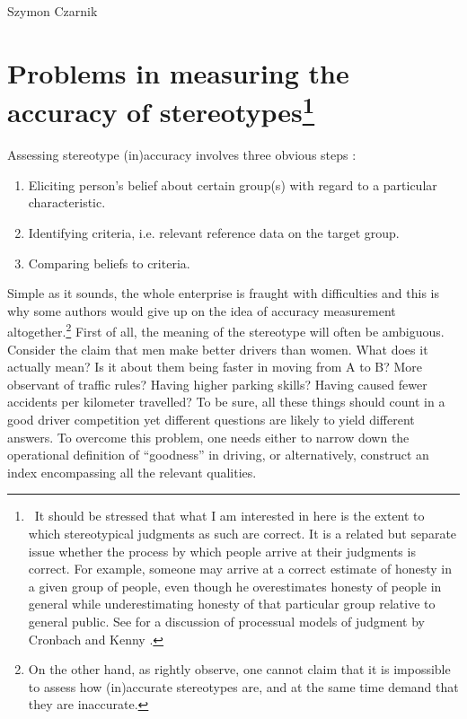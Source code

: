 \begin{artengenv}{Szymon Czarnik}
\enlargethispage{.5\baselineskip}
\section[Problems in measuring the accuracy of stereotypes]{Problems in measuring the accuracy of stereotypes\footnote{\ It should be stressed that what I am interested in here is the extent to which stereotypical judgments as such are correct. It is a related but separate issue whether the process by which people arrive at their judgments is correct. For example, someone may arrive at a correct estimate of honesty in a given group of people, even though he overestimates honesty of people in general while underestimating honesty of that particular group relative to general public. See
\parencite[][]{jussim_stereotype_2016} %
 for a discussion of processual models of judgment by Cronbach 
\parencite*[][]{cronbach_processes_1955} %
 and Kenny 
\parencite*[][]{kenny_interpersonal_1994}. %
 }}
Assessing stereotype (in)accuracy involves three obvious steps
\parencite[][]{jussim_stereotype_2015}:%


\begin{enumerate}
\item Eliciting person's belief about certain group(s) with regard to a particular characteristic.
\item Identifying criteria, i.e. relevant reference data on the target group.
\item Comparing beliefs to criteria.
\end{enumerate}
Simple as it sounds, the whole enterprise is fraught with difficulties and this is why some authors would give up on the idea of accuracy measurement altogether.\footnote{On the other hand, as
\parencite[][]{jussim_stereotype_2016} %
 rightly observe, one cannot claim that it is impossible to assess how (in)accurate stereotypes are, and at the same time demand that they are inaccurate.} First of all, the meaning of the stereotype will often be ambiguous. Consider the claim that men make better drivers than women. What does it actually mean? Is it about them being faster in moving from A to B? More observant of traffic rules? Having higher parking skills? Having caused fewer accidents per kilometer travelled? To be sure, all these things should count in a good driver competition yet different questions are likely to yield different answers. To overcome this problem, one needs either to narrow down the operational definition of ``goodness'' in driving, or alternatively, construct an index encompassing all the relevant qualities.


\end{artengenv}
